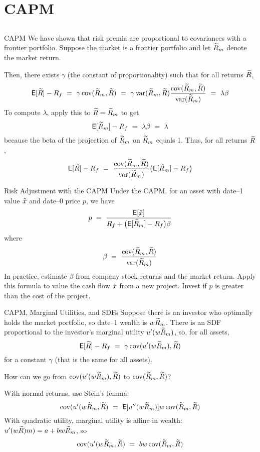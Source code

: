 \documentclass[xcolor=dvipsnames,10pt]{beamer}
\begin{document}
\section{CAPM}\subsection{}

\begin{frame}{CAPM}
We have shown that risk premia are proportional to covariances with a frontier portfolio.  Suppose the market is a frontier portfolio and let $\widetilde{R}_m$ denote the market return.  

Then, there exists $\gamma$ (the constant of proportionality) such that for all returns $\widetilde{R}$,
$$\mathsf{E}[\widetilde{R}] - R_f \ = \ \gamma \operatorname{cov}(\widetilde{R}_m,\widetilde{R}) \ = \ \gamma \operatorname{var}(\widetilde{R}_m,\widetilde{R})\frac{\operatorname{cov}(\widetilde{R}_m,\widetilde{R})}{\operatorname{var}(\widetilde{R}_m)} \ = \ \lambda \beta$$
To compute $\lambda$, apply this to $\widetilde{R}=\widetilde{R}_m$ to get
$$\mye[\tr_m]-R_f \ = \ \lambda \beta \ = \ \lambda$$
because the beta of the projection of $\widetilde{R}_m$ on $\widetilde{R}_m$ equals 1.  Thus, for all returns $\widetilde{R}$,
$$\mathsf{E}[\widetilde{R}] - R_f \ = \ \frac{\operatorname{cov}(\widetilde{R}_m,\widetilde{R})}{\operatorname{var}(\widetilde{R}_m)}\big(\mathsf{E}[\widetilde{R}_m] - R_f \big)$$ 
\end{frame}

\begin{frame}{Risk Adjustment with the CAPM}
Under the CAPM, for an asset with date--1 value $\tilde{x}$ and date--0 price $p$, we have
$$p \ = \ \frac{\mathsf{E}[\tilde{x}]}{R_f + \big(\mathsf{E}[\widetilde{R}_m] - R_f \big)\beta}$$
where
$$\beta \ = \ \frac{\cov(\tr_m,\tr)}{\var(\tr_m)}$$
In practice, estimate $\beta$ from company stock returns and the market return.  Apply this formula to value the cash flow $\tilde{x}$ from a new project. Invest if $p$ is greater than the cost of the project.
\end{frame}

\begin{frame}{CAPM, Marginal Utilities, and SDFs}
Suppose there is an investor who optimally holds the market portfolio, so date--1 wealth is $w\widetilde{R}_m$.  There is an SDF proportional to the investor's marginal utility $u'(w\widetilde{R}_m)$, so, for all assets,
$$\mathsf{E}[\widetilde{R}]-R_f \ = \ \gamma \operatorname{cov}(u'(w\widetilde{R}_m),\widetilde{R})$$
for a constant $\gamma$ (that is the same for all assets).

How can we go from $\operatorname{cov}(u'(w\widetilde{R}_m),\widetilde{R})$ to $\operatorname{cov}(\widetilde{R}_m,\widetilde{R})$?
\pause
\begin{enumerate}
\im With normal returns, use Stein's lemma: 
$$\operatorname{cov}(u'(w\widetilde{R}_m,\widetilde{R}) \ = \ \mathsf{E}[u''(w\widetilde{R}_m)] w \operatorname{cov}(\widetilde{R}_m,\widetilde{R})$$
\im With quadratic utility, marginal utility is affine in wealth: $u'(w\widetilde{R})m) = a + b w\widetilde{R}_m$, so
$$\operatorname{cov}(u'(w\widetilde{R}_m,\widetilde{R}) \ = \ b w \operatorname{cov}(\widetilde{R}_m,\widetilde{R})$$
\end{enumerate}
\end{frame}
\end{document}
